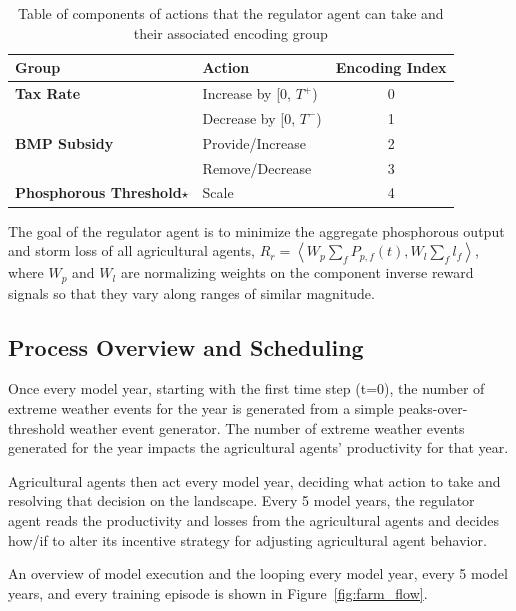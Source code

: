 \begin{longtable}{llc}
    \caption[Table of components of actions that the regulatory agent
    can take in the farm model]
    {Table of components of actions that the regulator agent can take and their associated encoding group}\label{tab:app_reg_action} \\
    \hline\hline
    Group & Action & Encoding Index \\
    \hline
    \endfirsthead
    \hline
    \endfoot
    \textbf{Tax Rate} & Increase by [0, $T^+$) & 0 \\
    & Decrease by [0, $T^-$) & 1 \\
    \textbf{BMP Subsidy} & Provide/Increase & 2 \\
    & Remove/Decrease & 3 \\
    \textbf{Phosphorous Threshold$\star$} & Scale & 4 \\
\end{longtable}

The goal of the regulator agent is to minimize the aggregate phosphorous
output and storm loss of all agricultural agents,
$R_r = \left<W_p\sum_fP_{p,f}(t), W_l\sum_fl_f\right>$,
where $W_p$ and $W_l$ are normalizing weights on the component
inverse reward signals so that they vary along ranges of similar magnitude.

\subsection{Process Overview and Scheduling}

Once every model year, starting with the first time step (t=0), 
the number of extreme weather events for the year is generated from a 
simple peaks-over-threshold weather event generator. 
The number of extreme weather events generated for the year 
impacts the agricultural agents' productivity for that year.

Agricultural agents then act every model year, 
deciding what action to take and resolving that decision on the landscape.
Every 5 model years, 
the regulator agent reads the productivity and losses from the agricultural
agents and decides how/if to alter its incentive strategy 
for adjusting agricultural agent behavior.

An overview of model execution and the looping every model
year, every 5 model years, and every training episode
is shown in Figure~\ref{fig:farm_flow}.

